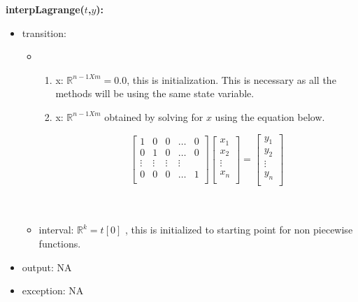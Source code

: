 \documentclass[12pt, titlepage]{article}
\begin{document}
\noindent \textbf{interpLagrange($t$,$y$):}
\begin{itemize}
	\item transition:
	\begin{itemize}
		\item 
		\begin{enumerate}
			\item x: $\mathbb{R}^{n-1 X m} = 0.0 $, this is initialization. 
			This is necessary as all the methods will be using the same state 
			variable.
			
			\item x: $\mathbb{R}^{n-1 X m}$ obtained by solving for $x$ using 
			the equation below.
			
			\begin{equation*}
			\begin{bmatrix}
			1 & 0 & 0 & \dots & 0 \\
			0 & 1 & 0 & \dots & 0 \\
			\vdots & \vdots & \vdots & \vdots \\
			0 & 0 & 0 & \dots & 1 \\
			\end{bmatrix}
			\begin{bmatrix}
			x_1  \\
			x_2 \\
			\vdots \\
			x_n \\
			\end{bmatrix} = 
			\begin{bmatrix}
			y_1  \\
			y_2 \\
			\vdots \\
			y_n \\
			\end{bmatrix}
			\end{equation*}\\ \\ 
		\end{enumerate}
		\item interval: $\mathbb{R}^{k} = t[0] $ , this is initialized to 
		starting point for non piecewise functions.
	\end{itemize}	
	\item output: NA 
	
	\item exception: NA
\end{itemize}
\end{document}
